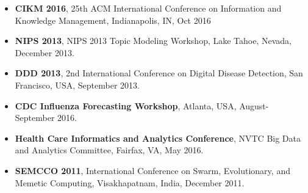 \begin{itemize}
  \item {\bf CIKM 2016}, 25th ACM International Conference on Information and Knowledge Management, Indianapolis, IN, Oct 2016
  \item {\bf NIPS 2013}, NIPS 2013 Topic Modeling Workshop, Lake Tahoe, Nevada, December 2013.
  \item {\bf DDD 2013}, 2nd International Conference on Digital Disease Detection, San Francisco, USA, September 2013.
  \item {\bf CDC Influenza Forecasting Workshop}, Atlanta, USA, August-September 2016.
  \item {\bf Health Care Informatics and Analytics Conference}, NVTC Big Data and Analytics Committee, Fairfax, VA, May 2016.
  \item {\bf SEMCCO 2011}, International Conference on Swarm, Evolutionary, and Memetic Computing, Visakhapatnam, India, December 2011.
\end{itemize}


